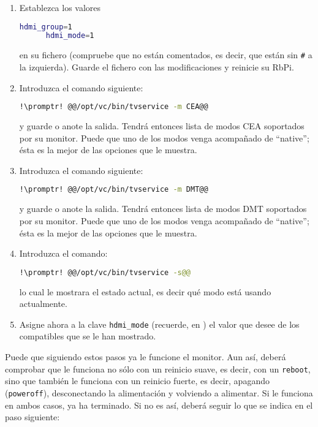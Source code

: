 \begin{enumerate}
  \item Establezca los valores
    \begin{lstlisting}[gobble=6,language=bash,style=bashinteract,escapechar=!]
      hdmi_group=1
      hdmi_mode=1
    \end{lstlisting}
    \noindent en su fichero  (compruebe que no están comentados, es decir, que están sin
    \verb+#+ a la izquierda). Guarde el fichero con las modificaciones y reinicie su RbPi.
  \item Introduzca el comando siguiente:
    \begin{lstlisting}[gobble=6,language=bash,style=bashinteract,escapechar=!]
      !\promptr! @@/opt/vc/bin/tvservice -m CEA@@
    \end{lstlisting}
    \noindent y guarde o anote la salida. Tendrá entonces lista de modos CEA soportados por su monitor. Puede
    que uno de los modos venga acompañado de ``native''; ésta es la mejor de las opciones que le muestra.
  \item Introduzca el comando siguiente:
    \begin{lstlisting}[gobble=6,language=bash,style=bashinteract,escapechar=!]
      !\promptr! @@/opt/vc/bin/tvservice -m DMT@@
    \end{lstlisting}
    \noindent y guarde o anote la salida. Tendrá entonces lista de modos DMT soportados por su monitor. Puede
    que uno de los modos venga acompañado de ``native''; ésta es la mejor de las opciones que le muestra.
  \item Introduzca el comando:
    \begin{lstlisting}[gobble=6,language=bash,style=bashinteract,escapechar=!]
      !\promptr! @@/opt/vc/bin/tvservice -s@@
    \end{lstlisting}
    \noindent lo cual le mostrara el estado actual, es decir qué modo está usando actualmente.
  \item Asigne ahora a la clave \texttt{hdmi\_mode} (recuerde, en ) el valor que desee de
    los compatibles que se le han mostrado.
\end{enumerate}

Puede que siguiendo estos pasos ya le funcione el monitor. Aun así, deberá comprobar que le funciona no sólo con
un reinicio suave, es decir, con un \lstinline!reboot!, sino que también le funciona con un reinicio fuerte, es
decir, apagando (\lstinline!poweroff!), desconectando la alimentación y volviendo a alimentar. Si le funciona en
ambos casos, ya ha terminado. Si no es así, deberá seguir lo que se indica en el paso siguiente:


